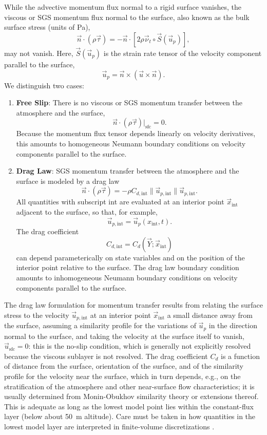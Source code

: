 \documentclass{report}
\begin{document}
While the advective momentum flux normal to a rigid surface vanishes, the viscous or SGS momentum flux normal to the surface, also known as the bulk surface stress (units of Pa), 
\[
\vec{n} \cdot (\rho \vec{\tau}) = - \vec{n} \cdot \left[2\rho \vec{\nu}_t \circ \vec{S}(\vec{u}_p)\right],
\]
may not vanish. Here, $\vec{S}(\vec{u}_p)$ is the strain rate tensor of the velocity component parallel to the surface,
 \[
    \vec{u}_p = \vec{n} \times (\vec{u} \times \vec{n}).
\]
We distinguish two cases:
\begin{enumerate}
    \item \textbf{Free Slip}: There is no viscous or SGS momentum transfer between the atmosphere and the surface,
    \[
    \vec{n} \cdot (\rho \vec{\tau})\bigl|_\mathrm{sfc} = 0.
    \]
    Because the momentum flux tensor depends linearly on velocity derivatives, this amounts to homogeneous Neumann boundary conditions on velocity components parallel to the surface.
    \item \textbf{Drag Law}: SGS momentum transfer between the atmosphere and the surface is modeled by a drag law 
    \begin{equation}\label{e:drag_law}
    \vec{n} \cdot (\rho \vec{\tau})  = - \rho C_{d, \mathrm{int}} \| \vec{u}_{p, \mathrm{int}} \| \vec{u}_{p, \mathrm{int}}.
    \end{equation}
    All quantities with subscript int are evaluated at an interior point $\vec{x}_\mathrm{int}$ adjacent to the surface, so that, for example,
    \[
   \vec{u}_{p, \mathrm{int}} = \vec{u}_p (x_\mathrm{int}, t).
    \]
    The drag coefficient
    \[
    C_{d, \mathrm{int}} = C_d(\vec{Y}; \vec{x}_\mathrm{int})
    \]
    can depend parameterically on state variables and on the position of the interior point relative to the surface. The drag law boundary condition amounts to inhomogeneous Neumann boundary conditions on velocity components parallel to the surface.
\end{enumerate}
The drag law formulation for momentum transfer results from relating the surface stress to the velocity $\vec{u}_{p, \mathrm{int}}$ at an interior point $\vec{x}_\mathrm{int}$ a small distance away from the surface, assuming a similarity profile for the variations of $\vec{u}_p$ in the direction normal to the surface, and taking the velocity at the surface itself to vanish, $\vec{u}_\mathrm{sfc} =0$: this is the no-slip condition, which is generally not explicitly resolved because the viscous sublayer is not resolved. The drag coefficient  $C_d$ is a function of distance from the surface, orientation of the surface, and of the similarity profile for the velocity near the surface, which in turn depends, e.g., on the stratification of the atmosphere and other near-surface flow characteristics; it is usually determined from Monin-Obukhov similarity theory or extensions thereof. This is adequate as long as the lowest model point lies within the constant-flux layer (below about 50~m altitude). Care must be taken in how quantities in the lowest model layer are interpreted in finite-volume discretizations  \citep{Nishizawa18a}.
\end{document}
